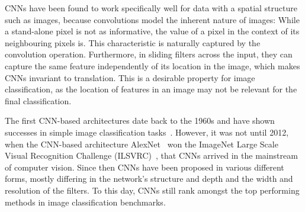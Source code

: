 \documentclass[a4paper]{article}
\begin{document}
CNNs have been found to work specifically well for data with a spatial structure
such as images, because convolutions model the inherent nature of images: While
a stand-alone pixel is not as informative, the value of a pixel in the context
of its neighbouring pixels is. This characteristic is naturally captured by the
convolution operation. Furthermore, in sliding filters across the input, they
can capture the same feature independently of its location in the image, which
makes CNNs invariant to translation. This is a desirable property for image
classification, as the location of features in an image may not be relevant for
the final classification.

The first CNN-based architectures date back to the 1960s and have shown
successes in simple image classification tasks~\cite{lenet}. However, it was not
until 2012, when the CNN-based architecture AlexNet~\cite{alexnet} won the
ImageNet Large Scale Visual Recognition Challenge (ILSVRC)~\cite{imagenet}, that
CNNs arrived in the mainstream of computer vision. Since then CNNs have been
proposed in various different forms, mostly differing in the network's structure
and depth and the width and resolution of the filters. To this day, CNNs still
rank amongst the top performing methods in image classification benchmarks.
\end{document}

